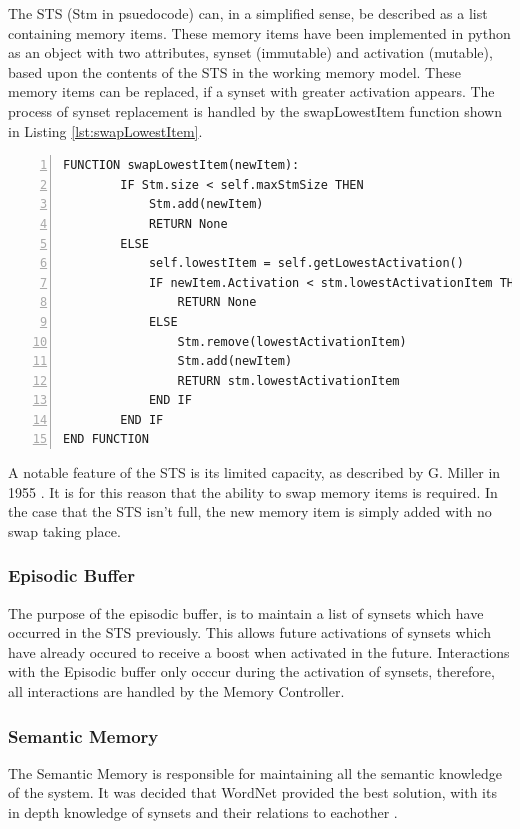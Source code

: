 \documentclass[]{article}
\begin{document}
The STS (Stm in psuedocode) can, in a simplified sense, be described as a list containing memory items. These memory items have been implemented in python as an object with two attributes, synset (immutable) and activation (mutable), based upon the contents of the STS in the working memory model. These memory items can be replaced, if a synset with greater activation appears. The process of synset replacement is handled by the swapLowestItem function shown in Listing \ref{lst:swapLowestItem}.

\begin{lstlisting}[numbers=left, numberstyle=\small, caption={the swapLowestItem function}, captionpos=b, label={lst:swapLowestItem}]
FUNCTION swapLowestItem(newItem):
        IF Stm.size < self.maxStmSize THEN
            Stm.add(newItem)
            RETURN None
        ELSE
            self.lowestItem = self.getLowestActivation()
            IF newItem.Activation < stm.lowestActivationItem THEN
                RETURN None
            ELSE
                Stm.remove(lowestActivationItem)
                Stm.add(newItem)
                RETURN stm.lowestActivationItem
            END IF
        END IF
END FUNCTION
\end{lstlisting}

A notable feature of the STS is its limited capacity, as described by G. Miller in 1955 \cite{SevenPlusMinusTwo}. It is for this reason that the ability to swap memory items is required. In the case that the STS isn't full, the new memory item is simply added with no swap taking place.

\subsubsection{Episodic Buffer}
\label{sec:ImplementedEpisodicBuffer}

The purpose of the episodic buffer, is to maintain a list of synsets which have occurred in the STS previously. This allows future activations of synsets which have already occured to receive a boost when activated in the future. Interactions with the Episodic buffer only occcur during the activation of synsets, therefore, all interactions are handled by the Memory Controller.

\subsubsection{Semantic Memory}
\label{sec:ImplementedSemanticMemory}

The Semantic Memory is responsible for maintaining all the semantic knowledge of the system. It was decided that WordNet provided the best solution, with its in depth knowledge of synsets and their relations to eachother \cite{WN2Nouns, WN4Verbs}.
\end{document}
